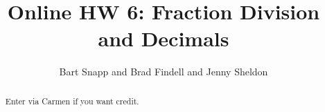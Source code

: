 \documentclass[handout,space,nooutcomes]{xourse}
\title{Online HW 6: Fraction Division and Decimals}
\author{Bart Snapp and Brad Findell and Jenny Sheldon}
\begin{document}
\begin{abstract}
Enter via Carmen if you want credit.   
\end{abstract}
\maketitle


\end{document}
